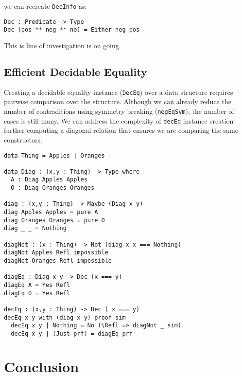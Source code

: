 \documentclass[%
draft,
a4paper,
UKenglish,
cleveref,
autoref,
thm-restate,
pdfa
]{oasics-v2021}
\begin{document}
we can recreate \texttt{DecInfo} as:

\begin{verbatim}
Dec : Predicate -> Type
Dec (pos ** neg ** no) = Either neg pos
\end{verbatim}

This is line of investigation is on going.

\subsection{Efficient Decidable Equality}
\label{sec:idioms:decEq}



Creating a decidable equality instance (\texttt{DecEq}) over a data structure requires pairwise comparison over the structure.
Although we can already reduce the number of contraditions using symmetry breaking (\texttt{negEqSym}), the number of cases is still many.
We can address the complexity of \texttt{decEq} instance creation further computing a diagonal relation that ensures we are comparing the same constructors.

\begin{verbatim}
data Thing = Apples | Oranges

data Diag : (x,y : Thing) -> Type where
  A : Diag Apples Apples
  O : Diag Oranges Oranges

diag : (x,y : Thing) -> Maybe (Diag x y)
diag Apples Apples = pure A
diag Oranges Oranges = pure O
diag _ _ = Nothing

diagNot : (x : Thing) -> Not (diag x x === Nothing)
diagNot Apples Refl impossible
diagNot Oranges Refl impossible

diagEq : Diag x y -> Dec (x === y)
diagEq A = Yes Refl
diagEq O = Yes Refl

decEq : (x,y : Thing) -> Dec ( x === y)
decEq x y with (diag x y) proof sim
  decEq x y | Nothing = No (\Refl => diagNot _ sim)
  decEq x y | (Just prf) = diagEq prf
\end{verbatim}

\section{Conclusion}
\label{sec:conclusion}



\end{document}
